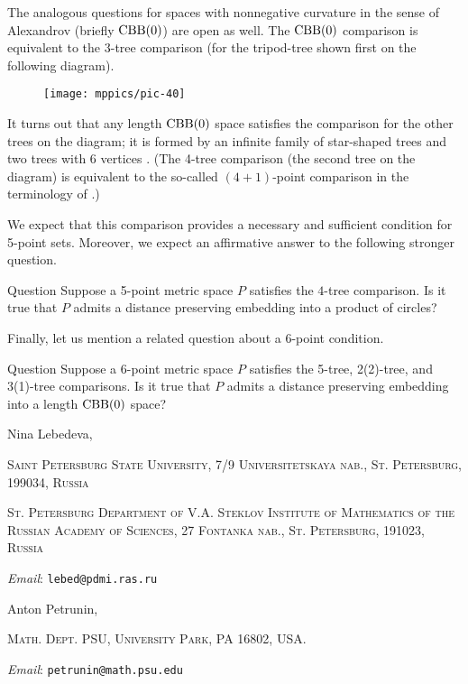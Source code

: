 \documentclass{article}
\makeatletter
\newcommand{\Addresses}{{\bigskip\footnotesize

\noindent Nina Lebedeva,
\par\nopagebreak
 \textsc{Saint Petersburg State University, 7/9 Universitetskaya nab., St. Petersburg, 199034, Russia}
\par
\nopagebreak
 \textsc{St. Petersburg Department of V.A. Steklov Institute of Mathematics of the Russian Academy of Sciences, 27 Fontanka nab., St. Petersburg, 191023, Russia}
  \par\nopagebreak
  \textit{Email}: \texttt{lebed@pdmi.ras.ru}

\medskip

\noindent   Anton Petrunin, 
\par\nopagebreak
 \textsc{Math. Dept. PSU, University Park, PA 16802, USA.}
  \par\nopagebreak
  \textit{Email}: \texttt{petrunin@math.psu.edu}
  
}}
\makeatother
\begin{document}
The analogous questions for  spaces with nonnegative curvature in the sense of Alexandrov (briefly $\mathrm{CBB}(0)$) are open as well.
The $\mathrm{CBB}(0)$ comparison is equivalent to the $3$-tree comparison (for the tripod-tree shown first on the following diagram).
\begin{figure}[h!]
\vskip-0mm
\centering
\texttt{[image: mppics/pic-40]}
\end{figure}
It turns out that any length $\mathrm{CBB}(0)$ space satisfies the comparison for the other trees on the diagram; it is formed by an infinite family of star-shaped trees and two trees with 6 vertices \cite{alexander-kapovitch-petrunin-2011,lebedeva-petrunin-zolotov}.
(The 4-tree comparison (the second tree on the diagram) is equivalent to the so-called $(4{+}1)$-point comparison in the terminology of \cite{alexander-kapovitch-petrunin-2011}.)

We expect that this comparison provides a necessary and sufficient condition for 5-point sets. Moreover, we expect an affirmative answer to the following stronger question.


\begin{thm}{Question}
Suppose a 5-point metric space $P$ satisfies the $4$-tree comparison.
Is it true that $P$ admits a distance preserving embedding into a product of circles?
\end{thm}

Finally, let us mention a related question about a 6-point condition. 

\begin{thm}{Question}
Suppose a 6-point metric space $P$ satisfies the 5-tree, 2(2)-tree, and 3(1)-tree comparisons.
Is it true that $P$ admits a distance preserving embedding into a length $\mathrm{CBB}(0)$ space?
\end{thm}

{\sloppy
\printbibliography[heading=bibintoc]
\fussy
}

\Addresses
\end{document}

